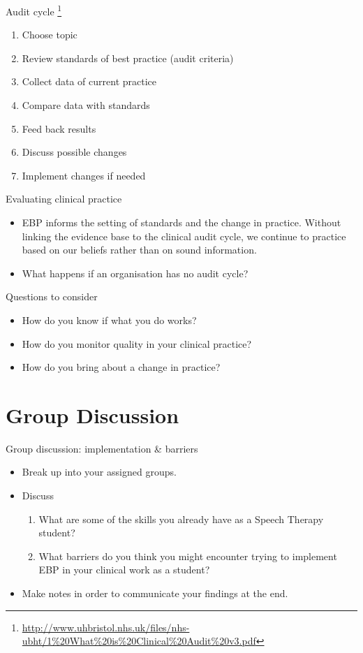 \documentclass{beamer}
\begin{document}
% 
\begin{frame}{Audit cycle \footnote{\tiny{\url{http://www.uhbristol.nhs.uk/files/nhs-ubht/1\%20What\%20is\%20Clinical\%20Audit\%20v3.pdf}}}}
	\begin{enumerate}
	\item Choose topic
	\item Review standards of best practice (audit criteria)
	\item Collect data of current practice
	\item Compare data with standards
	\item Feed back results
	\item Discuss possible changes
	\item Implement changes if needed
	\end{enumerate}
\end{frame}

% 
\begin{frame}{Evaluating clinical practice}
	\begin{itemize}
	\item EBP informs the setting of standards and the change in practice. Without linking the \alert{evidence base} to the \alert{clinical audit cycle}, we continue to practice based on our beliefs rather than on sound information.
	\item What happens if an organisation has no audit cycle?
	\end{itemize}
\end{frame}

% 
\begin{frame}{Questions to consider}
	\begin{itemize}
	\item How do you know if what \alert{you} do works? %
	\item How do you monitor quality in \alert{your} clinical practice? %
	\item How do you bring about a \alert{change} in practice?
	\end{itemize}
\end{frame}

\section{Group Discussion}

% 
\begin{frame}{Group discussion: implementation \& barriers}
	\begin{itemize}
	\item Break up into your assigned groups.
	\item Discuss
		\begin{enumerate}
		\item What are some of the skills you already have as a Speech Therapy student?
		\item What barriers do you think you might encounter trying to implement EBP in your clinical work as a student?
		\end{enumerate}
	\item Make notes in order to communicate your findings at the end.
	\end{itemize}
\end{frame}
\end{document}

